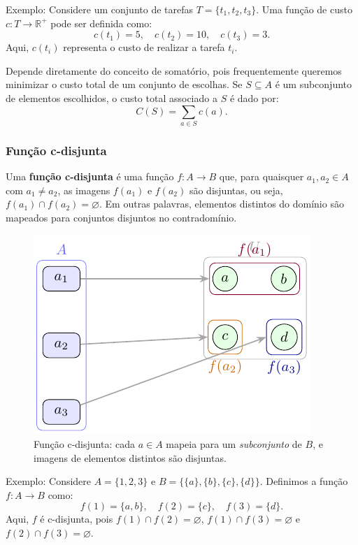 Exemplo: Considere um conjunto de tarefas \(T = \{t_1, t_2, t_3\}\). Uma função de custo \(c: T \to \mathbb{R}^+\) pode ser definida como:
\[c(t_1) = 5, \quad c(t_2) = 10, \quad c(t_3) = 3.\]
Aqui, \(c(t_i)\) representa o custo de realizar a tarefa \(t_i\).


Depende diretamente do conceito de somatório, pois frequentemente queremos minimizar o custo total de um conjunto de escolhas. Se \(S \subseteq A\) é um subconjunto de elementos escolhidos, o custo total associado a \(S\) é dado por:
\[C(S) = \sum_{a \in S} c(a).\]

\subsubsection{Função c-disjunta}
Uma \textbf{função c-disjunta} é uma função \(f: A \to B\) que, para quaisquer \(a_1, a_2 \in A\) com \(a_1 \neq a_2\), as imagens \(f(a_1)\) e \(f(a_2)\) são disjuntas, ou seja, \(f(a_1) \cap f(a_2) = \varnothing\). Em outras palavras, elementos distintos do domínio são mapeados para conjuntos disjuntos no contradomínio.


\begin{figure}[H]
	\centering
	\includegraphics[width=0.9\linewidth]{figures/fig_c_disjunta.pdf}

	\caption{Função c-disjunta: cada \(a\in A\) mapeia para um \emph{subconjunto} de $B$, e imagens de elementos distintos são disjuntas.}
	\label{fig:c-disjunta}
\end{figure}



Exemplo: Considere \(A = \{1, 2, 3\}\) e \(B = \{\{a\}, \{b\}, \{c\}, \{d\}\}\). Definimos a função \(f: A \to B\) como:
\[f(1) = \{a, b\}, \quad f(2) = \{c\}, \quad f(3) = \{d\}.\]
Aqui, \(f\) é c-disjunta, pois \(f(1) \cap f(2) = \varnothing\), \(f(1) \cap f(3) = \varnothing\) e \(f(2) \cap f(3) = \varnothing\).

